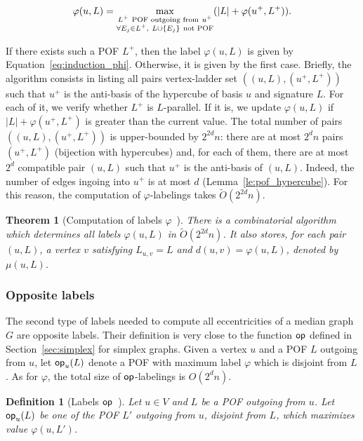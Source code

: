 \documentclass{article}
\newtheorem{theorem}{Theorem}
\newtheorem{definition}{Definition}
\newcommand{\set}[1]{\left\{ #1 \right\}}
\newcommand{\card}[1]{\left| #1 \right|}
\newcommand{\opp}{\mbox{\textsf{op}}}
\begin{document}
\begin{equation}
    \varphi(u,L) = \max\limits_{\substack{L^+ ~\mbox{\scriptsize{POF outgoing from}}~ u^+ \\ \forall E_j \in L^+,~ L \cup \set{E_j} ~\mbox{\scriptsize{not POF}}}} (\card{L} + \varphi(u^+,L^+)).
\label{eq:induction_phi}
\end{equation}

If there exists such a POF $L^+$, then the label $\varphi(u,L)$ is given by Equation~\eqref{eq:induction_phi}. Otherwise, it is given by the first case. Briefly, the algorithm consists in listing all pairs vertex-ladder set $((u,L),(u^+,L^+))$ such that $u^+$ is the anti-basis of the hypercube of basis $u$ and signature $L$. For each of it, we verify whether $L^+$ is $L$-parallel. If it is, we update $\varphi(u,L)$ if $\card{L} + \varphi(u^+,L^+)$ is greater than the current value. The total number of pairs $((u,L),(u^+,L^+))$ is upper-bounded by $2^{2d}n$: there are at most $2^dn$ pairs $(u^+,L^+)$ (bijection with hypercubes) and, for each of them, there are at most $2^d$ compatible pair $(u,L)$ such that $u^+$ is the anti-basis of $(u,L)$. Indeed, the number of edges ingoing into $u^+$ is at most $d$ (Lemma~\ref{le:pof_hypercube}). For this reason, the computation of $\varphi$-labelings takes $\tilde{O}(2^{2d}n)$.

\begin{theorem}[Computation of labels $\varphi$~\cite{BeHa21}]
There is a combinatorial algorithm which determines all labels $\varphi(u,L)$ in $\tilde{O}(2^{2d}n)$. It also stores, for each pair $(u,L)$, a vertex $v$ satisfying $L_{u,v} = L$ and $d(u,v) = \varphi(u,L)$, denoted by $\mu(u,L)$.
\label{th:compute_phi}
\end{theorem}

\subsubsection{Opposite labels}

The second type of labels needed to compute all eccentricities of a median graph $G$ are opposite labels. Their definition is very close to the function $\opp$ defined in Section~\ref{sec:simplex} for simplex graphs. Given a vertex $u$ and a POF $L$ outgoing from $u$, let $\opp_u(L)$ denote a POF with maximum label $\varphi$ which is disjoint from $L$. As for $\varphi$, the total size of $\opp$-labelings is $O(2^dn)$.

\begin{definition}[Labels $\opp$~\cite{BeHa21}]
Let $u \in V$ and $L$ be a POF outgoing from $u$. Let $\opp_u(L)$ be one of the POF $L'$ outgoing from $u$, disjoint from $L$, which maximizes value $\varphi(u,L')$.
\end{definition}
\end{document}
